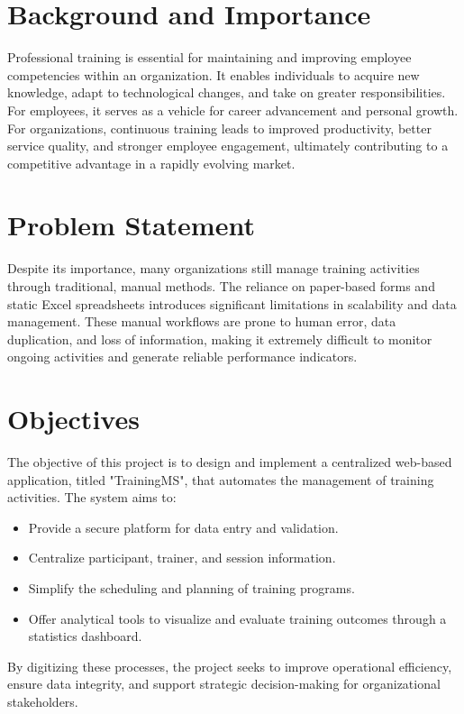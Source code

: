 \section{Background and Importance}
Professional training is essential for maintaining and improving employee competencies within an organization. It enables individuals to acquire new knowledge, adapt to technological changes, and take on greater responsibilities. For employees, it serves as a vehicle for career advancement and personal growth. For organizations, continuous training leads to improved productivity, better service quality, and stronger employee engagement, ultimately contributing to a competitive advantage in a rapidly evolving market.

\section{Problem Statement}
Despite its importance, many organizations still manage training activities through traditional, manual methods. The reliance on paper-based forms and static Excel spreadsheets introduces significant limitations in scalability and data management. These manual workflows are prone to human error, data duplication, and loss of information, making it extremely difficult to monitor ongoing activities and generate reliable performance indicators.

\section{Objectives}
The objective of this project is to design and implement a centralized web-based application, titled "TrainingMS", that automates the management of training activities. The system aims to:
\begin{itemize}
    \item Provide a secure platform for data entry and validation.
    \item Centralize participant, trainer, and session information.
    \item Simplify the scheduling and planning of training programs.
    \item Offer analytical tools to visualize and evaluate training outcomes through a statistics dashboard.
\end{itemize}
By digitizing these processes, the project seeks to improve operational efficiency, ensure data integrity, and support strategic decision-making for organizational stakeholders.
